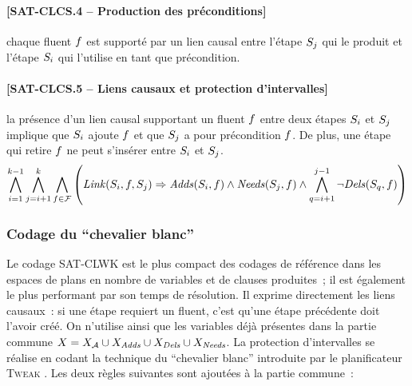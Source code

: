 \paragraph*{[SAT-CLCS.4 -- Production des préconditions]} chaque fluent $f$ est supporté par un lien causal entre l'étape $S_{j}$ qui le produit et l'étape $S_{i}$ qui l'utilise en tant que précondition.
\paragraph*{[SAT-CLCS.5 -- Liens causaux et protection d'intervalles]} la présence d'un lien
  causal supportant un fluent $f$ entre deux étapes $S_{i}$ et $S_{j}$
  implique que $S_{i}$ ajoute $f$ et que $S_{j}$ a pour précondition
  $f$. De plus, une étape qui retire $f$ ne peut s'insérer entre $S_{i}$ et $S_{j}$.
\[
\BigforallTwo{i=1}{k-1} \BigforallTwo{j=i+1}{k} \Bigforall{\f\in \F} \left( %
  \Linksteps{i}{\f}{j} \Rightarrow \Adds{i}{\f} \land \Needs{j}{\f} \land %
  \BigforallTwo{q=i+1}{j-1} \lnot \Dels{q}{\f}%
  \right)
\]

\subsubsection{Codage du \enquote{chevalier blanc}}

Le codage SAT-CLWK est le plus compact des codages de référence dans les espaces de plans en nombre de variables et de clauses produites~; il est également le plus performant par son temps de résolution. Il exprime directement les liens causaux~: si une étape requiert un fluent, c'est qu'une étape précédente doit l'avoir créé. On n'utilise ainsi que les variables déjà présentes dans la partie commune $X = X_{\mathcal{A}} \cup X_{\mathit{Adds}}\cup X_{\mathit{Dels}}\cup X_{\mathit{Needs}}$. La protection d'intervalles se réalise en codant la technique du \enquote{chevalier blanc} introduite par le planificateur \textsc{Tweak} \cite{Cha87}. Les deux règles suivantes sont ajoutées à la partie commune~:


